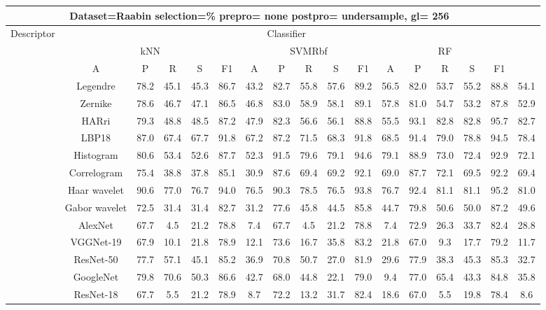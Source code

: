 \documentclass[12pt,italian]{article}
\begin{document}
\begin{tiny}
\begin{longtable}{lcccccccccccccccc}
\toprule
\multicolumn{16}{c}{Dataset=Raabin selection=\% prepro= none postpro= undersample, gl= 256} \\ 
\toprule
Descriptor & \multicolumn{15}{c}{Classifier} \\ 
& \multicolumn{5}{c}{kNN} & \multicolumn{5}{c}{SVMRbf} & \multicolumn{5}{c}{RF} \\ 
& A & P & R & S & F1 & A & P & R & S & F1 & A & P & R & S & F1 \\ 
\midrule
& Legendre & 78.2 & 45.1 & 45.3 & 86.7 & 43.2 & 82.7 & 55.8 & 57.6 & 89.2 & 56.5 & 82.0 & 53.7 & 55.2 & 88.8 & 54.1 \\ 
& Zernike & 78.6 & 46.7 & 47.1 & 86.5 & 46.8 & 83.0 & 58.9 & 58.1 & 89.1 & 57.8 & 81.0 & 54.7 & 53.2 & 87.8 & 52.9 \\ 
& HARri & 79.3 & 48.8 & 48.5 & 87.2 & 47.9 & 82.3 & 56.6 & 56.1 & 88.8 & 55.5 & 93.1 & 82.8 & 82.8 & 95.7 & 82.7 \\ 
& LBP18 & 87.0 & 67.4 & 67.7 & 91.8 & 67.2 & 87.2 & 71.5 & 68.3 & 91.8 & 68.5 & 91.4 & 79.0 & 78.8 & 94.5 & 78.4 \\ 
& Histogram & 80.6 & 53.4 & 52.6 & 87.7 & 52.3 & 91.5 & 79.6 & 79.1 & 94.6 & 79.1 & 88.9 & 73.0 & 72.4 & 92.9 & 72.1 \\ 
& Correlogram & 75.4 & 38.8 & 37.8 & 85.1 & 30.9 & 87.6 & 69.4 & 69.2 & 92.1 & 69.0 & 87.7 & 72.1 & 69.5 & 92.2 & 69.4 \\ 
& Haar wavelet & 90.6 & 77.0 & 76.7 & 94.0 & 76.5 & 90.3 & 78.5 & 76.5 & 93.8 & 76.7 & 92.4 & 81.1 & 81.1 & 95.2 & 81.0 \\ 
& Gabor wavelet & 72.5 & 31.4 & 31.4 & 82.7 & 31.2 & 77.6 & 45.8 & 44.5 & 85.8 & 44.7 & 79.8 & 50.6 & 50.0 & 87.2 & 49.6 \\ 
& AlexNet & 67.7 &  4.5 & 21.2 & 78.8 &  7.4 & 67.7 &  4.5 & 21.2 & 78.8 &  7.4 & 72.9 & 26.3 & 33.7 & 82.4 & 28.8 \\ 
& VGGNet-19 & 67.9 & 10.1 & 21.8 & 78.9 & 12.1 & 73.6 & 16.7 & 35.8 & 83.2 & 21.8 & 67.0 &  9.3 & 17.7 & 79.2 & 11.7 \\ 
& ResNet-50 & 77.7 & 57.1 & 45.1 & 85.2 & 36.9 & 70.8 & 50.7 & 27.0 & 81.9 & 29.6 & 77.9 & 38.3 & 45.3 & 85.3 & 32.7 \\ 
& GoogleNet & 79.8 & 70.6 & 50.3 & 86.6 & 42.7 & 68.0 & 44.8 & 22.1 & 79.0 &  9.4 & 77.0 & 65.4 & 43.3 & 84.8 & 35.8 \\ 
& ResNet-18 & 67.7 &  5.5 & 21.2 & 78.9 &  8.7 & 72.2 & 13.2 & 31.7 & 82.4 & 18.6 & 67.0 &  5.5 & 19.8 & 78.4 &  8.6 \\ 

\end{longtable}
\end{tiny}
\end{document}
